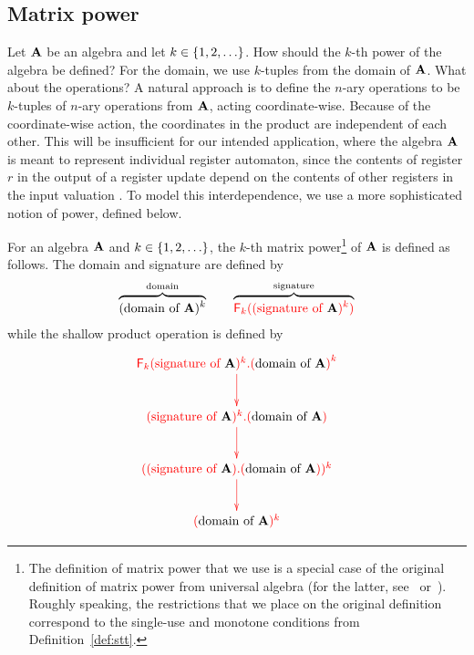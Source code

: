 \subsection{Matrix power} 
\label{sec:matrix-power-subsec}
Let ${\color{black}\mathbf A}$ be an algebra and let $k \in \{1,2,\ldots\}$. How should the $k$-th power of the algebra be defined? For the domain, we use  $k$-tuples from the domain of ${\color{black}\mathbf A}$.  What about the operations? A natural   approach is to define the $n$-ary operations to be  $k$-tuples of $n$-ary operations from ${\color{black}\mathbf A}$, acting coordinate-wise. Because of the coordinate-wise action,  the coordinates in the product are independent of each other. This will be insufficient for our intended application, where the algebra ${\color{black}\mathbf A}$ is meant to represent individual register automaton, since the contents of register $r$ in the output of a register update depend on the contents of other registers in the input valuation . To  model this interdependence, we use a more sophisticated notion of power, 
defined below.
\begin{definition}
    For an algebra ${\color{black}\mathbf A}$ and $k \in \{1,2,\ldots\}$, the $k$-th matrix power\footnote{
        The definition of matrix power that we use is a special case of the original definition of matrix power from universal algebra (for the latter, see~\cite{Taylor1975} or~\cite{szendrei1990simple}). Roughly speaking, the restrictions that we place on the original definition correspond to the single-use and monotone conditions from Definition~\ref{def:stt}. 
    } of ${\color{black}\mathbf A}$ is defined as follows. The domain and signature are defined by
    \begin{align*}
    \overbrace{({\color{black}\text{domain of }}{\color{black}\mathbf A})^k}^{\text{domain}} \qquad \overbrace{
        {\color{red}{{\color{red}{\mathsf F_{k}}}(({\color{red}{\text{signature of }}}{\color{black}\mathbf A})^k)}}}^{\text{signature}}
        \end{align*}
        while the  shallow product operation is defined by
        \begin{align*}
            \ranked{
        \xymatrix{
            \shallowterm {\reduce k (\algops \alg)^{k}} {{(\algdom \alg)}^k} \ar[d] \\
            \shallowterm {(\algops \alg)^{k}} {{(\algdom \alg)}} \ar[d] \\
            (\shallowterm {(\algops \alg)} {{(\algdom \alg)}})^k
         \ar[d]\\
            (\algdom \alg)^k
        }
        }
        \end{align*}
\end{definition}

